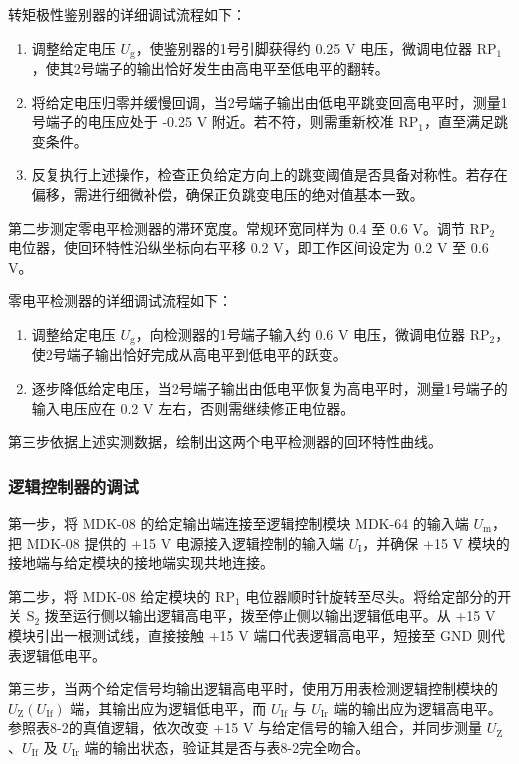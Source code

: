 \begin{framed}
{			转矩极性鉴别器的详细调试流程如下：
			\begin{enumerate}
				\item 调整给定电压 $U_\text{g}$，使鉴别器的1号引脚获得约 0.25 V 电压，微调电位器 $\text{RP}_1$，使其2号端子的输出恰好发生由高电平至低电平的翻转。
				\item 将给定电压归零并缓慢回调，当2号端子输出由低电平跳变回高电平时，测量1号端子的电压应处于 -0.25 V 附近。若不符，则需重新校准 $\text{RP}_1$，直至满足跳变条件。
				\item 反复执行上述操作，检查正负给定方向上的跳变阈值是否具备对称性。若存在偏移，需进行细微补偿，确保正负跳变电压的绝对值基本一致。
			\end{enumerate}
			
			第二步测定零电平检测器的滞环宽度。常规环宽同样为 0.4 至 0.6 V。调节 $\text{RP}_2$ 电位器，使回环特性沿纵坐标向右平移 0.2 V，即工作区间设定为 0.2 V 至 0.6 V。
			
			零电平检测器的详细调试流程如下：
			\begin{enumerate}
				\item 调整给定电压 $U_\text{g}$，向检测器的1号端子输入约 0.6 V 电压，微调电位器 $\text{RP}_2$，使2号端子输出恰好完成从高电平到低电平的跃变。
				\item 逐步降低给定电压，当2号端子输出由低电平恢复为高电平时，测量1号端子的输入电压应在 0.2 V 左右，否则需继续修正电位器。
			\end{enumerate}
			
			第三步依据上述实测数据，绘制出这两个电平检测器的回环特性曲线。
			
			\subsubsection{逻辑控制器的调试}
			第一步，将 MDK-08 的给定输出端连接至逻辑控制模块 MDK-64 的输入端 $U_\text{m}$，把 MDK-08 提供的 +15 V 电源接入逻辑控制的输入端 $U_\text{I}$，并确保 +15 V 模块的接地端与给定模块的接地端实现共地连接。
			
			第二步，将 MDK-08 给定模块的 $\text{RP}_1$ 电位器顺时针旋转至尽头。将给定部分的开关 $\text{S}_2$ 拨至运行侧以输出逻辑高电平，拨至停止侧以输出逻辑低电平。从 +15 V 模块引出一根测试线，直接接触 +15 V 端口代表逻辑高电平，短接至 GND 则代表逻辑低电平。
			
			第三步，当两个给定信号均输出逻辑高电平时，使用万用表检测逻辑控制模块的 $U_\text{Z}(U_\text{If})$ 端，其输出应为逻辑低电平，而 $U_\text{If}$ 与 $U_\text{Ir}$ 端的输出应为逻辑高电平。参照表8-2的真值逻辑，依次改变 +15 V 与给定信号的输入组合，并同步测量 $U_\text{Z}$、$U_\text{If}$ 及 $U_\text{Ir}$ 端的输出状态，验证其是否与表8-2完全吻合。
			
}
\end{framed}
